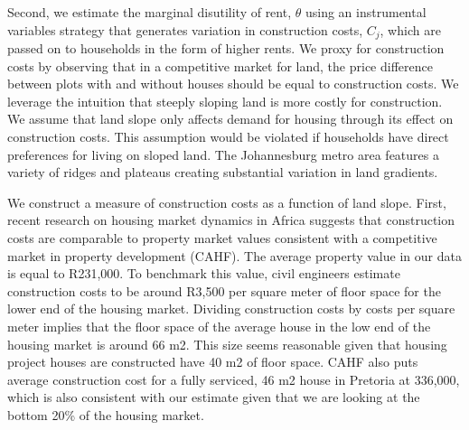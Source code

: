 \documentclass[12pt]{article}
\begin{document}




Second, we estimate the marginal disutility of rent, $\theta$ using an instrumental variables strategy that generates variation in construction costs, $C_j$, which are passed on to households in the form of higher rents.  We proxy for construction costs by observing that in a competitive market for land, the price difference between plots with and without houses should be equal to construction costs.  We leverage the intuition that steeply sloping land is more costly for construction.  We assume that land slope only affects demand for housing through its effect on construction costs.  This assumption would be violated if households have direct preferences for living on sloped land.   The Johannesburg metro area features a variety of ridges and plateaus creating substantial variation in land gradients.


We construct a measure of construction costs as a function of land slope.  First, recent research on housing market dynamics in Africa suggests that construction costs are comparable to property market values consistent with a competitive market in property development (CAHF).  The average property value in our data is equal to R231,000.  To benchmark this value, civil engineers estimate construction costs to be around R3,500 per square meter of floor space for the lower end of the housing market.  Dividing construction costs by costs per square meter implies that the floor space of the average house in the low end of the housing market is around 66 m2.  This size seems reasonable given that housing project houses are constructed have 40 m2 of floor space.  CAHF also puts average construction cost for a fully serviced, 46 m2 house in Pretoria at 336,000, which is also consistent with our estimate given that we are looking at the bottom 20\% of the housing market.
\end{document}

